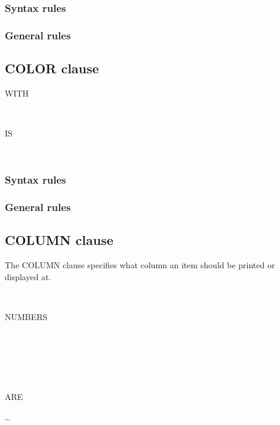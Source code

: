 \subsubsection{Syntax rules}

\subsubsection{General rules}

\subsection{COLOR clause}

\begin{syntax}[\miscextcolour]
  WITH
  \begin{1=}
     \\
  \end{1=}
  IS
  \begin{1=}
    \identifier \\
    \literal
  \end{1=}
\end{syntax}

\subsubsection{Syntax rules}

\subsubsection{General rules}

\subsection{COLUMN clause}

The COLUMN clause specifies what column an item should be printed or displayed at.

\begin{syntax}
  \begin{1=}
    \begin{1=}
       \\
    \end{1=}
    NUMBERS
    \begin{0-1}
       \\
    \end{0-1} \\

    \begin{1=}
       \\
    \end{1=}
    ARE
  \end{1=}
  \begin{1=}
    \begin{0-1}
    \end{0-1}
    \integer
  \end{1=}
  \ldots
\end{syntax}

